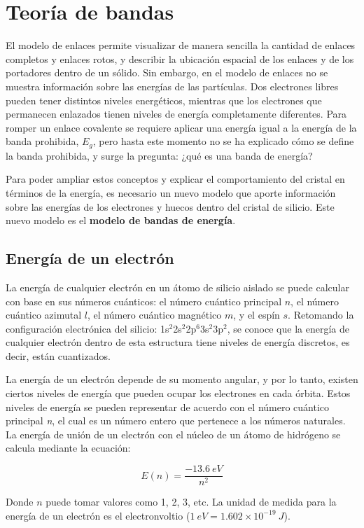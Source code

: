 \chapter{Teoría de bandas}

El modelo de enlaces permite visualizar de manera sencilla la cantidad de enlaces completos y enlaces rotos, y describir la ubicación espacial de los enlaces y de los portadores dentro de un sólido. Sin embargo, en el modelo de enlaces no se muestra información sobre las energías de las partículas. Dos electrones libres pueden tener distintos niveles energéticos, mientras que los electrones que permanecen enlazados tienen niveles de energía completamente diferentes. Para romper un enlace covalente se requiere aplicar una energía igual a la energía de la banda prohibida, $E_g$, pero hasta este momento no se ha explicado cómo se define la banda prohibida, y surge la pregunta: ¿qué es una banda de energía?

Para poder ampliar estos conceptos y explicar el comportamiento del cristal en términos de la energía, es necesario un nuevo modelo que aporte información sobre las energías de los electrones y huecos dentro del cristal de silicio. Este nuevo modelo es el \textbf{modelo de bandas de energía}.

\section{Energía de un electrón}

La energía de cualquier electrón en un átomo de silicio aislado se puede calcular con base en sus números cuánticos: el número cuántico principal $n$, el número cuántico azimutal $l$, el número cuántico magnético $m$, y el espín $s$. Retomando la configuración electrónica del silicio: 1s$^2$2s$^2$2p$^6$3s$^2$3p$^2$, se conoce que la energía de cualquier electrón dentro de esta estructura tiene niveles de energía discretos, es decir, están cuantizados.

La energía de un electrón depende de su momento angular, y por lo tanto, existen ciertos niveles de energía que pueden ocupar los electrones en cada órbita. Estos niveles de energía se pueden representar de acuerdo con el número cuántico principal \textit{n}, el cual es un número entero que pertenece a los números naturales. La energía de unión de un electrón con el núcleo de un átomo de hidrógeno se calcula mediante la ecuación:

\[E(n) = \dfrac{-13.6\ eV}{n^2}\]

Donde $n$ puede tomar valores como 1, 2, 3, etc. La unidad de medida para la energía de un electrón es el electronvoltio ($1\ eV = 1.602\times{}10^{-19}\ J$).

